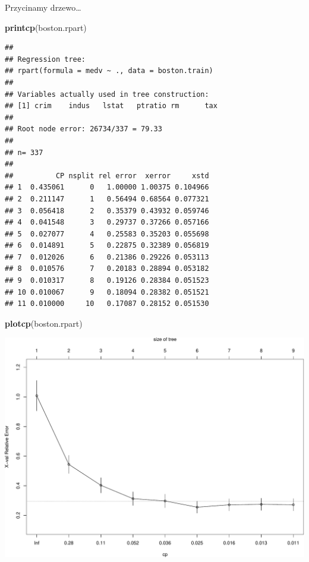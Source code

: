 \documentclass[]{book}
\newenvironment{Shaded}{\begin{snugshade}}{\end{snugshade}}
\newcommand{\KeywordTok}[1]{\textcolor[rgb]{0.13,0.29,0.53}{\textbf{#1}}}
\newcommand{\NormalTok}[1]{#1}
\theoremstyle{plain}
\theoremstyle{definition}
\theoremstyle{definition}
\theoremstyle{definition}
\theoremstyle{definition}
\theoremstyle{remark}
\begin{document}
Przycinamy drzewo\ldots{}

\begin{Shaded}
\begin{Highlighting}[]
\KeywordTok{printcp}\NormalTok{(boston.rpart)}
\end{Highlighting}
\end{Shaded}

\begin{verbatim}
## 
## Regression tree:
## rpart(formula = medv ~ ., data = boston.train)
## 
## Variables actually used in tree construction:
## [1] crim    indus   lstat   ptratio rm      tax    
## 
## Root node error: 26734/337 = 79.33
## 
## n= 337 
## 
##          CP nsplit rel error  xerror     xstd
## 1  0.435061      0   1.00000 1.00375 0.104966
## 2  0.211147      1   0.56494 0.68564 0.077321
## 3  0.056418      2   0.35379 0.43932 0.059746
## 4  0.041548      3   0.29737 0.37266 0.057166
## 5  0.027077      4   0.25583 0.35203 0.055698
## 6  0.014891      5   0.22875 0.32389 0.056819
## 7  0.012026      6   0.21386 0.29226 0.053113
## 8  0.010576      7   0.20183 0.28894 0.053182
## 9  0.010317      8   0.19126 0.28384 0.051523
## 10 0.010067      9   0.18094 0.28382 0.051521
## 11 0.010000     10   0.17087 0.28152 0.051530
\end{verbatim}

\begin{Shaded}
\begin{Highlighting}[]
\KeywordTok{plotcp}\NormalTok{(boston.rpart)}
\end{Highlighting}
\end{Shaded}

\includegraphics{EksploracjaDanych_files/figure-latex/unnamed-chunk-33-1.pdf}
\end{document}
